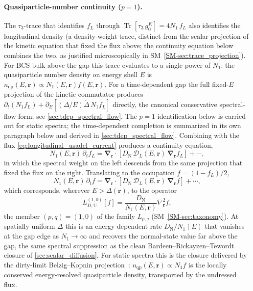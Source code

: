 \documentclass[
  aps,
  prb,
  preprint,
  superscriptaddress,
  longbibliography,
  nofootinbib
]{revtex4-2}
\newcommand{\Tr}{\operatorname{Tr}}
\newcommand{\br}{\mathbf{r}}
\newcommand{\bnabla}{\boldsymbol{\nabla}}
\newcommand{\DOS}{N_1}
\newcommand{\DN}{D_{\mathrm{N}}}
\newcommand{\fL}{f_L}
\newcommand{\qp}{\mathrm{qp}}
\begin{document}
\paragraph{Quasiparticle-number continuity ($p=1$).} The
\(\tau_3\)-trace that identifies \(\fL\) through
\(\Tr[\tau_3\,g_0^K]=4\DOS\,\fL\) also identifies the longitudinal density
(a density-weight trace, distinct from the scalar projection of the
kinetic equation that fixed the flux above; the continuity equation
below combines the two, as justified microscopically in
SM~\cref{SM-sec:trace_projection}).
For BCS bulk above the gap this trace evaluates to a single power of
\(\DOS\): the quasiparticle number density on energy shell \(E\) is
\(n_{\qp}(E,\br)\propto\DOS(E,\br)f(E,\br)\). For a time-dependent gap the
full fixed-\(E\) projection of the kinetic commutator produces
\(\partial_t(\DOS\fL)+\partial_E[(\Delta/E)\dot\Delta\,\DOS\fL]\)
directly, the canonical conservative spectral-flow form; see
\cref{sec:tdep_spectral_flow}. The \(p=1\) identification below is
carried out for static spectra; the time-dependent completion is
summarized in its own paragraph below and derived in
\cref{sec:tdep_spectral_flow}. Combining with
the flux \cref{eq:longitudinal_usadel_current} produces a continuity
equation,
\begin{equation}
  \DOS(E,\br)\,\partial_t\fL
  =
  \bnabla_{\br}\cdot
  \left[\DN\,\mathcal{D}_L(E,\br)\,\bnabla_{\br}\fL\right]
  + \cdots ,
  \label{eq:usadel_continuity_form_fL}
\end{equation}
in which the spectral weight on the left descends from the same
projection that fixed the flux on the right. Translating to the occupation
\(f=(1-\fL)/2\),
\begin{equation}
  \DOS(E,\br)\,\partial_t f
  =
  \bnabla_{\br}\cdot
  \left[\DN\,\mathcal{D}_L(E,\br)\,\bnabla_{\br}f\right]
  + \cdots ,
  \label{eq:usadel_continuity_form}
\end{equation}
which corresponds, wherever \(E>\Delta(\br)\), to the operator
\begin{equation}
  L_{D,\mathrm{U}}^{(1,0)}[f]
  =
  \frac{\DN}{\DOS(E,\br)}
  \nabla_{\br}^2 f ,
  \label{eq:usadel_LD_p1q0}
\end{equation}
the member \((p,q)=(1,0)\) of the family \(L_{p,q}\)
(SM~\cref{SM-sec:taxonomy}). At spatially uniform \(\Delta\) this
is an energy-dependent rate \(\DN/\DOS(E)\) that vanishes at the gap edge
as \(\DOS\to\infty\) and recovers the normal-state value far above the
gap, the same spectral suppression as the clean
Bardeen--Rickayzen--Tewordt closure of \cref{sec:scalar_diffusion}.
For static spectra this is the closure delivered by the dirty-limit
Belzig--Kopnin projection~\cite{belzig1999,kopnin2001}: \(n_{\qp}(E,\br)\propto\DOS f\)
is the locally conserved energy-resolved quasiparticle density, transported
by the undressed flux.
\end{document}
